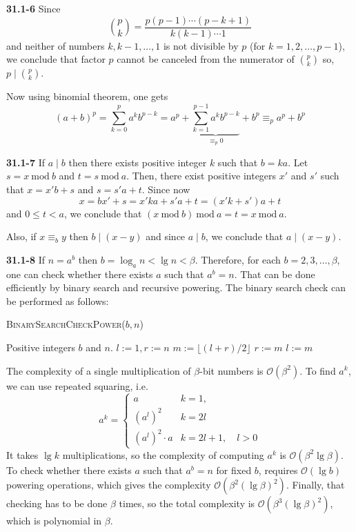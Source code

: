 \documentclass[12pt]{amsart}
\numberwithin{equation}{section}
\renewcommand{\O}{\mathcal{O}}
\renewcommand{\mod}{\mathrm{\ mod\ }}
\renewcommand{\(}{\left(}
\renewcommand{\)}{\right)}
\renewcommand{\[}{\left[}
\renewcommand{\]}{\right]}
\begin{document}
\pagestyle{empty}

\noindent \textbf{31.1-6} Since
$$
\binom pk = \frac{p(p-1)\cdots (p-k+1)}{k(k-1)\cdots 1}
$$
and neither of numbers $k, k-1, \ldots, 1$ is not divisible by $p$ (for $k=1,2,\ldots,p-1$), we conclude that factor $p$ cannot be canceled from the numerator of $\binom pk$ so, $p \mid \binom pk$.

\medskip

Now using binomial theorem, one gets
$$
(a+b)^p = \sum_{k=0}^p a^kb^{p-k} = a^p + \underbrace{\sum_{k=1}^{p-1} a^kb^{p-k}}_{\equiv_p0} + b^p \equiv_p a^p+b^p
$$

\bigskip

\noindent \textbf{31.1-7} If $a\mid b$ then there exists positive integer $k$ such that $b=ka$. Let $s=x \mod b$ and $t=s \mod a$. Then, there exist positive integers $x'$ and $s'$ such that $x=x'b+s$ and $s=s'a+t$. Since now
$$
x=bx'+s = x'ka+ s'a+t = (x'k+s')a+t
$$
and $0\leq t < a$, we conclude that $(x \mod b)\mod a = t=x \mod a$.

\smallskip

Also, if $x\equiv_b y$ then $b\mid(x-y)$ and since $a\mid b$, we conclude that $a\mid (x-y)$.


\bigskip

\noindent \textbf{31.1-8} If $n=a^b$ then $b=\log_a n<\lg n < \beta$. Therefore, for each $b=2, 3, \ldots, \beta$, one can check whether there exists $a$ such that $a^b = n$.
That can be done efficiently by binary search and recursive powering. The binary search check can be performed as follows:

\begin{algorithm}[H]
\caption{\textsc{BinarySearchCheckPower}($b, n$)}
\begin{algorithmic}[1]
\REQUIRE Positive integers $b$ and $n$.
\STATE $l:=1, r:=n$
    \STATE $m:=\lfloor(l + r)/2\rfloor$
        \STATE $r:=m$
    \ELSE 
        \STATE $l:=m$
    \ENDIF
\ENDWHILE
{}
\end{algorithmic}
\end{algorithm}
The complexity of a single multiplication of $\beta$-bit numbers is $\O(\beta^2)$. To find $a^k$, we can use repeated squaring, i.e.
$$
a^k = \begin{cases}
a & k=1,\\
(a^l)^2 & k=2l\\
(a^l)^2\cdot a & k=2l+1, \quad l>0
\end{cases}
$$
It takes $\lg k$ multiplications, so the complexity of computing $a^k$ is $\O(\beta^2\lg\beta)$. To check whether there exists $a$ such that $a^b=n$ for fixed $b$, requires $\O(\lg b)$ powering operations, which gives the complexity $\O(\beta^2 (\lg \beta)^2)$. Finally, that checking has to be done $\beta$ times, so the total complexity is $\O(\beta^3 (\lg \beta)^2)$, which is polynomial in $\beta$.
\end{document}
